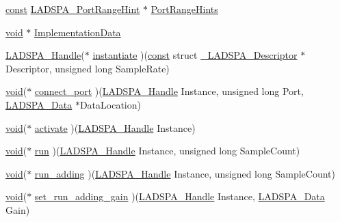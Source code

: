 \begin{DoxyCompactItemize}
\item 
\hyperlink{getopt1_8c_a2c212835823e3c54a8ab6d95c652660e}{const} \hyperlink{src_2effects_2ladspa_2ladspa_8h_a7e37004ec91d14bac773882b9d7c5593}{L\+A\+D\+S\+P\+A\+\_\+\+Port\+Range\+Hint} $\ast$ \hyperlink{struct___l_a_d_s_p_a___descriptor_ad6117a9bbd25f27711c5f87670ee55dd}{Port\+Range\+Hints}
\item 
\hyperlink{sound_8c_ae35f5844602719cf66324f4de2a658b3}{void} $\ast$ \hyperlink{struct___l_a_d_s_p_a___descriptor_a6ca8b79996cc9fd26c8d630a94b9d9cf}{Implementation\+Data}
\item 
\hyperlink{src_2effects_2ladspa_2ladspa_8h_add2c8d62e2cb03e4fd16ab3f997d4195}{L\+A\+D\+S\+P\+A\+\_\+\+Handle}($\ast$ \hyperlink{struct___l_a_d_s_p_a___descriptor_aca162cd242c75b0a82b44b3c74f8c2cf}{instantiate} )(\hyperlink{getopt1_8c_a2c212835823e3c54a8ab6d95c652660e}{const} struct \hyperlink{struct___l_a_d_s_p_a___descriptor}{\+\_\+\+L\+A\+D\+S\+P\+A\+\_\+\+Descriptor} $\ast$Descriptor, unsigned long Sample\+Rate)
\item 
\hyperlink{sound_8c_ae35f5844602719cf66324f4de2a658b3}{void}($\ast$ \hyperlink{struct___l_a_d_s_p_a___descriptor_a4e48646797e0e95c8a5ba9fd0905f381}{connect\+\_\+port} )(\hyperlink{src_2effects_2ladspa_2ladspa_8h_add2c8d62e2cb03e4fd16ab3f997d4195}{L\+A\+D\+S\+P\+A\+\_\+\+Handle} Instance, unsigned long Port, \hyperlink{src_2effects_2ladspa_2ladspa_8h_aad99c00d8bf98c0c147f2b38fad9e3ff}{L\+A\+D\+S\+P\+A\+\_\+\+Data} $\ast$Data\+Location)
\item 
\hyperlink{sound_8c_ae35f5844602719cf66324f4de2a658b3}{void}($\ast$ \hyperlink{struct___l_a_d_s_p_a___descriptor_a2d4d3bc5d0d27125134345440518a89d}{activate} )(\hyperlink{src_2effects_2ladspa_2ladspa_8h_add2c8d62e2cb03e4fd16ab3f997d4195}{L\+A\+D\+S\+P\+A\+\_\+\+Handle} Instance)
\item 
\hyperlink{sound_8c_ae35f5844602719cf66324f4de2a658b3}{void}($\ast$ \hyperlink{struct___l_a_d_s_p_a___descriptor_ab12cb9da61c3dc58c9272dfd48c0ad70}{run} )(\hyperlink{src_2effects_2ladspa_2ladspa_8h_add2c8d62e2cb03e4fd16ab3f997d4195}{L\+A\+D\+S\+P\+A\+\_\+\+Handle} Instance, unsigned long Sample\+Count)
\item 
\hyperlink{sound_8c_ae35f5844602719cf66324f4de2a658b3}{void}($\ast$ \hyperlink{struct___l_a_d_s_p_a___descriptor_a4205db566b20da9afb0d8927c2707795}{run\+\_\+adding} )(\hyperlink{src_2effects_2ladspa_2ladspa_8h_add2c8d62e2cb03e4fd16ab3f997d4195}{L\+A\+D\+S\+P\+A\+\_\+\+Handle} Instance, unsigned long Sample\+Count)
\item 
\hyperlink{sound_8c_ae35f5844602719cf66324f4de2a658b3}{void}($\ast$ \hyperlink{struct___l_a_d_s_p_a___descriptor_a16fac9ef817388439f85538b364ca5e7}{set\+\_\+run\+\_\+adding\+\_\+gain} )(\hyperlink{src_2effects_2ladspa_2ladspa_8h_add2c8d62e2cb03e4fd16ab3f997d4195}{L\+A\+D\+S\+P\+A\+\_\+\+Handle} Instance, \hyperlink{src_2effects_2ladspa_2ladspa_8h_aad99c00d8bf98c0c147f2b38fad9e3ff}{L\+A\+D\+S\+P\+A\+\_\+\+Data} Gain)

\end{DoxyCompactItemize}
